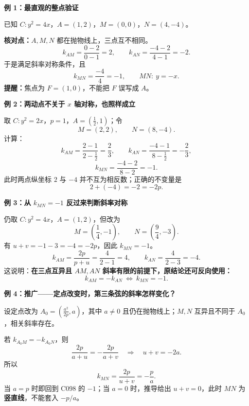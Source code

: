 \clearpage
\begin{examplebox}
\textbf{例 1：最直观的整点验证}

已知 $C:y^2=4x$，$A=(1,2)$，$M=(0,0)$，$N=(4,-4)$。

\textbf{核对点：}$A,M,N$ 都在抛物线上，三点互不相同。
\[
 k_{AM}=\frac{0-2}{0-1}=2,\qquad
 k_{AN}=\frac{-4-2}{4-1}=-2.
\]
于是满足斜率对称条件，且
\[
 \boxed{k_{MN}=\frac{-4}{4}=-1},\qquad MN:\ y=-x.
\]
\textbf{提醒：}焦点为 $F=(1,0)$，不能把 $F$ 误写成 $A$。
\end{examplebox}

\clearpage
\begin{examplebox}
\textbf{例 2：两动点不关于 $x$ 轴对称，也照样成立}
\begin{center}\end{center}


取 $C:y^2=2x$，$p=1$，$A=(\frac12,1)$；令
\[
 M=(2,2),\qquad N=(8,-4).
\]
计算：
\[
 k_{AM}=\frac{2-1}{2-\frac12}=\frac23,\qquad
 k_{AN}=\frac{-4-1}{8-\frac12}=-\frac23,
\]
\[
 k_{MN}=\frac{-4-2}{8-2}=\boxed{-1}.
\]
此时两点纵坐标 $2$ 与 $-4$ 并不互为相反数；正确的不变量是
\[
 2+(-4)=-2=-2p.
\]
\end{examplebox}

\clearpage
\begin{examplebox}
\textbf{例 3：从 $k_{MN}=-1$ 反过来判断斜率对称}

仍取 $C:y^2=4x$，$A=(1,2)$，但改为
\[
 M=\left(\frac14,-1\right),\qquad
 N=\left(\frac94,-3\right).
\]
有 $u+v=-1-3=-4=-2p$，因此 $k_{MN}=-1$。
\[
 k_{AM}=\frac{2p}{p+u}=\frac4{2-1}=4,\qquad
 k_{AN}=\frac4{2-3}=-4.
\]
这说明：\textbf{在三点互异且 $AM,AN$ 斜率有限的前提下，原结论还可反向使用：}
\[
 \boxed{k_{AM}=-k_{AN}\ \Longleftrightarrow\ k_{MN}=-1}.
\]
\end{examplebox}

\clearpage
\begin{examplebox}
\textbf{例 4：推广——定点改变时，第三条弦的斜率怎样变化？}
\begin{center}\end{center}


设定点改为 $A_0=(\frac{a^2}{2p},a)$，其中 $a\ne0$ 且仍在抛物线上；$M,N$ 互异且不同于 $A_0$，相关斜率存在。

若 $k_{A_0M}=-k_{A_0N}$，则
\[
 \frac{2p}{a+u}=-\frac{2p}{a+v}
 \quad\Longrightarrow\quad u+v=-2a.
\]
所以
\[
 \boxed{k_{MN}=\frac{2p}{u+v}=-\frac pa}.
\]
当 $a=p$ 时即回到 C098 的 $-1$；当 $a=0$ 时，推导给出 $u+v=0$，此时 $MN$ 为\textbf{竖直线}，不能套入 $-p/a$。
\end{examplebox}

